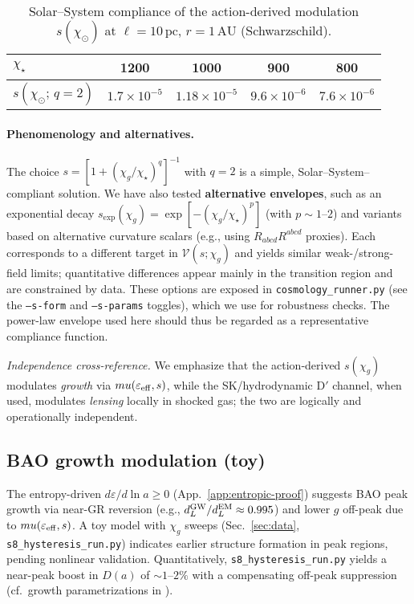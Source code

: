 \documentclass[aps,prd,onecolumn,superscriptaddress,nofootinbib]{revtex4-2}
\def\mu{mu}%
\begin{document}
\begin{table}[t]
\centering
\caption{Solar–System compliance of the action-derived modulation \(s(\chi_\odot)\) at \(\ell=10\,\mathrm{pc}\), \(r=1\,\mathrm{AU}\) (Schwarzschild).}
\label{tab:compliance}
\begin{tabular}{lcccc}
\toprule
$\chi_\star$ & 1200 & 1000 & 900 & 800 \\
\midrule
$s(\chi_\odot;\,q{=}2)$ & $1.7\times 10^{-5}$ & $1.18\times 10^{-5}$ & $9.6\times 10^{-6}$ & $7.6\times 10^{-6}$ \\
\bottomrule
\end{tabular}
\end{table}

\paragraph{Phenomenology and alternatives.}
The choice \(s=[1+(\chi_g/\chi_\star)^q]^{-1}\) with \(q=2\) is a simple, Solar–System–compliant solution. We have also tested \textbf{alternative envelopes}, such as an exponential decay \(s_{\exp}(\chi_g)=\exp[-(\chi_g/\chi_\star)^p]\) (with \(p\!\sim\!1\text{--}2\)) and variants based on alternative curvature scalars (e.g., using \(R_{abcd}R^{abcd}\) proxies). Each corresponds to a different target in \(\mathcal V(s;\chi_g)\) and yields similar weak-/strong-field limits; quantitative differences appear mainly in the transition region and are constrained by data. These options are exposed in \texttt{cosmology\_runner.py} (see the \texttt{--s-form} and \texttt{--s-params} toggles), which we use for robustness checks. The power-law envelope used here should thus be regarded as a representative compliance function.

\noindent\emph{Independence cross-reference.} We emphasize that the action‑derived $s(\chi_g)$ modulates \emph{growth} via $\mu(\varepsilon_{\rm eff},s)$, while the SK/hydrodynamic D$'$ channel, when used, modulates \emph{lensing} locally in shocked gas; the two are logically and operationally independent.

\subsection{BAO growth modulation (toy)}
The entropy-driven \(d\varepsilon/d\ln a \geq 0\) (App.~\ref{app:entropic-proof}) suggests BAO peak growth via near-GR reversion (e.g., \(d_L^{\rm GW}/d_L^{\rm EM}\approx 0.995\)) and lower \(g\) off-peak due to \(\mu(\varepsilon_{\rm eff},s)\). A toy model with \(\chi_g\) sweeps (Sec.~\ref{sec:data}, \texttt{s8\_hysteresis\_run.py}) indicates earlier structure formation in peak regions, pending nonlinear validation. Quantitatively, \texttt{s8\_hysteresis\_run.py} yields a near-peak boost in \(D(a)\) of \(\sim 1\text{--}2\%\) with a compensating off-peak suppression (cf.\ growth parametrizations in \cite{BelliniSawicki2014}).
\end{document}
